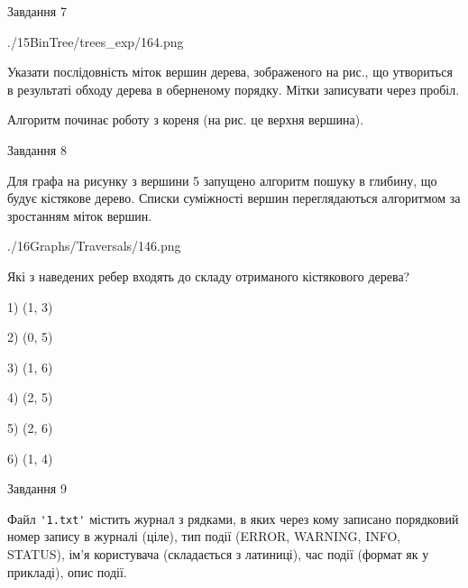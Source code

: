 \documentclass[12pt, ukrainian]{article}
\def\code#1{\Verb!#1!}
\begin{document}
{\vspace{10mm}\par

\newpage
\begin{minipage}[t]{9.7cm}
               
{\begin{center}Завдання {7}\end{center}}
\vspace{-6mm}

\begin{center}
	{./15BinTree/trees_exp/164.png}
\end{center}
Указати послідовність міток вершин дерева, зображеного на рис., що утвориться в результаті обходу дерева в оберненому порядку. Мітки записувати через пробіл.\par Алгоритм починає роботу з кореня (на рис. це верхня вершина).\par

\end{minipage}
\vline \hspace{8mm}
\begin{minipage}[t]{8.0cm}
               
{\begin{center}Завдання {8}\end{center}}
\vspace{-6mm}
Для графа на рисунку з вершини 5 запущено алгоритм пошуку в глибину, що будує кістякове дерево. Списки суміжності вершин переглядаються алгоритмом за зростанням міток вершин.\par
\begin{center}
	{./16Graphs/Traversals/146.png}
\end{center}
\par Які з наведених ребер входять до складу отриманого кістякового дерева?\par
1) (1, 3)\par
2) (0, 5)\par
3) (1, 6)\par
4) (2, 5)\par
5) (2, 6)\par
6) (1, 4)\par
{\vskip 15pt} \par

\end{minipage}

               
{\begin{center}Завдання {9}\end{center}}
\vspace{-6mm}
Файл \code{'1.txt'} містить журнал з рядками, в яких через кому записано поряд\-ко\-вий номер запису в журналі (ціле), тип події (ERROR, WARNING, INFO, STATUS), ім'я користувача (складається з латиниці), час події (фор\-мат як у прикладі), опис події.

}
\end{document}
